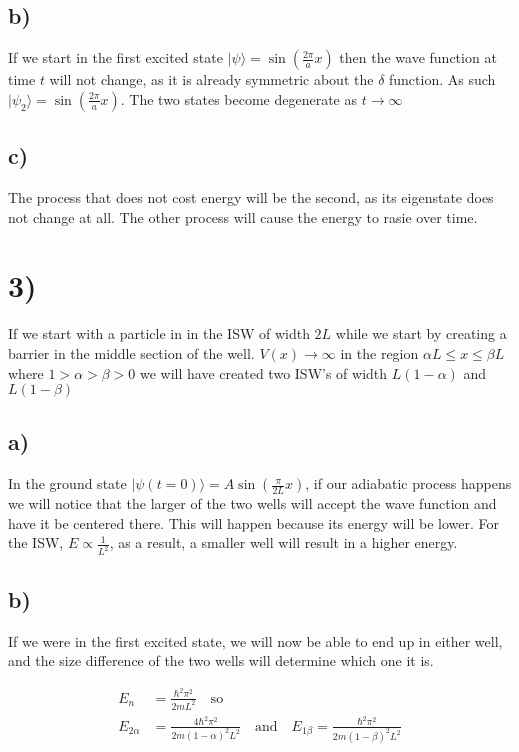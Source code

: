 \documentclass{article}
\newcommand{\bra}[1]{|#1\rangle}
\begin{document}
\subsection*{b)}

If we start in the first excited state $\bra{\psi}=\sin(\frac{2\pi}{a}x)$ then the wave function at time $t$ will not change, as it is already symmetric about the $\delta$ function. As such $\bra{\psi_2}=\sin{(\frac{2\pi}{a}x)}$. The two states become degenerate as $t\rightarrow{\infty}$


\subsection*{c)}
The process that does not cost energy will be the second, as its eigenstate does not change at all. The other process will cause the energy to rasie over time.


\section*{3)}

If we start with a particle in  in the ISW of width $2L$ while we start by creating a barrier in the middle section of the well. $V(x)\rightarrow\infty$ in the region $\alpha{L}\leq{x}\leq\beta{L}$ where $1>\alpha>\beta>0$ we will have created two ISW's of width $L(1-\alpha)$ and $L(1-\beta)$

\subsection*{a)}
In the ground state $\bra{\psi(t=0)}=A\sin(\frac{\pi}{2L}x)$, if our adiabatic process happens we will notice that the larger of the two wells will accept the wave function and have it be centered there. This will happen because its energy will be lower. For the ISW, $E\propto\frac{1}{L^2}$, as a result, a smaller well will result in a higher energy.

\subsection*{b)}
If we were in the first excited state, we will now be able to end up in either well, and the size difference of the two wells will determine which one it is.

\begin{align*}
    E_n&=\frac{\hbar^2\pi^2}{2mL^2}\quad\text{so}\\[1em]
    E_{2\alpha}&=\frac{4\hbar^2\pi^2}{2m(1-\alpha)^2L^2}\quad\text{and}\quad E_{1\beta}=\frac{\hbar^2\pi^2}{2m(1-\beta)^2L^2}
\end{align*}
\end{document}
